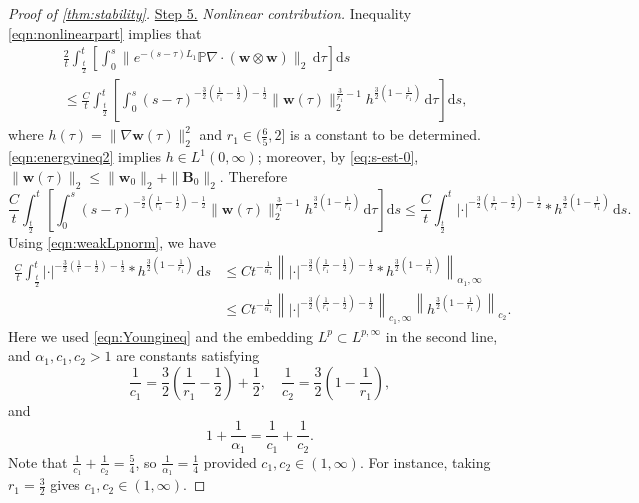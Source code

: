 \documentclass[10pt]{amsart}
\theoremstyle{plain}
\theoremstyle{definition}
\theoremstyle{remark}
\numberwithin{equation}{section}
\newcommand{\bw}{{\boldsymbol{w}}}
\newcommand{\bB}{{\boldsymbol{B}}}
\begin{document}
\begin{proof}[Proof of \cref{thm:stability}]
\uline{Step 5.} \emph{Nonlinear contribution.} Inequality \cref{eqn:nonlinearpart} implies that
\begin{align*}
&\frac{2}{t} \int_{\frac{t}{2}}^{t} \left[ \int_0^s  \|e^{-(s-\tau)L_1} \mathbb{P}\nabla\cdot (\bw \otimes \bw)\|_2 \, \mathrm{d} \tau \right] \mathrm{d}s\\
& \le  \frac{C}{t} \int_{\frac{t}{2}}^{t} 
\left[ \int_0^s (s-\tau)^{-\frac{3}{2}(\frac{1}{r_1}-\frac{1}{2})-\frac{1}{2}} \|\bw(\tau)\|_2^{\frac{3}{r_1}-1}  h^{\frac
32(1-\frac{1}{r_1})} \, \mathrm{d} \tau \right] \mathrm{d}s,
\end{align*}
where $h(\tau)=\|\nabla \bw(\tau)\|_2^2$ and $r_1\in (\frac{6}{5},2]$ is a constant to be determined. 
\cref{eqn:energyineq2} implies $h\in L^{1}(0,\infty)$; moreover, by \eqref{eq:s-est-0}, $\|\bw(\tau)\|_2 \le \|\bw_0\|_2+\|\bB_0\|_2$.
Therefore
\[
\frac{C}{t} \int_{\frac{t}{2}}^{t} 
\left[ \int_0^s (s-\tau)^{-\frac{3}{2}(\frac{1}{r_1}-\frac{1}{2})-\frac{1}{2}} \|\bw(\tau)\|_2^{\frac{3}{r_1}-1}  h^{\frac
32(1-\frac{1}{r_1})} \, \mathrm{d} \tau \right] \mathrm{d}s
\le 
\frac{C}{t} \int_{\frac{t}{2}}^{t} 
|\cdot|^{-\frac{3}{2}(\frac{1}{r_1}-\frac{1}{2})-\frac{1}{2}} \ast h^{\frac{3}{2}(1-\frac{1}{r_1})}\, \mathrm{d}s.
\]
Using \cref{eqn:weakLpnorm}, we have
\begin{align*}
\frac{C}{t} \int_{\frac{t}{2}}^{t} 
|\cdot|^{-\frac{3}{2}(\frac{1}{r}-\frac{1}{2})-\frac{1}{2}} \ast h^{\frac{3}{2}(1-\frac{1}{r_1})}\, \mathrm{d}s
& \le Ct^{-\frac{1}{\alpha_1}}\left\| |\cdot|^{-\frac{3}{2}(\frac{1}{r_1}-\frac{1}{2})-\frac{1}{2}} \ast h^{\frac{3}{2}(1-\frac{1}{r_1})} \right\|_{\alpha_1,\infty}\\
& \le  Ct^{-\frac{1}{\alpha_1}}
\left\| |\cdot|^{-\frac{3}{2}(\frac{1}{r_1}-\frac{1}{2})-\frac{1}{2}}\right\|_{c_1,\infty} 
\left\| h^{\frac{3}{2}(1-\frac{1}{r_1})} \right\|_{c_2}.
\end{align*}
Here we used \cref{eqn:Youngineq} and the embedding $L^p \subset L^{p,\infty}$ in the second line, and $\alpha_1,c_1,c_2>1$ are constants satisfying
\[
\frac{1}{c_1}=\frac{3}{2}\left(\frac{1}{r_1}-\frac{1}{2}\right)+\frac{1}{2},\quad
\frac{1}{c_2}=\frac{3}{2}\left(1-\frac{1}{r_1}\right),
\]
and
\[
1+\frac{1}{\alpha_1}=\frac{1}{c_1}+\frac{1}{c_2}.
\]
Note that $\frac{1}{c_1}+\frac{1}{c_2}=\frac{5}{4}$, so $\frac{1}{\alpha_1}=\frac{1}{4}$ provided $c_1,c_2\in (1,\infty)$. For instance, taking $r_1=\frac{3}{2}$ gives $c_1,c_2\in(1,\infty)$.

\end{proof}
\end{document}
